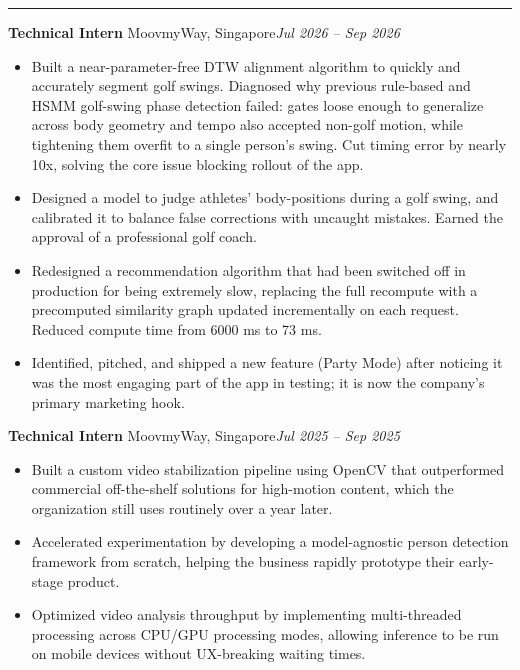 \documentclass[11pt]{article}
\newcommand{\cvsection}[1]{%
  \vspace{10pt}%
  \noindent{\large\bfseries\MakeUppercase{#1}}\par
  \vspace{-4pt}\noindent\rule{\linewidth}{0.7pt}\vspace{4pt}%
}
\begin{document}
\cvsection{Experience}
\noindent\textbf{Technical Intern} MoovmyWay, Singapore\hfill\textit{Jul 2026 -- Sep 2026}\par
\begin{itemize}
  \item Built a near-parameter-free DTW alignment algorithm to quickly and accurately segment golf swings. Diagnosed why previous rule-based and HSMM golf-swing phase detection failed: gates loose enough to generalize across body geometry and tempo also accepted non-golf motion, while tightening them overfit to a single person's swing. Cut timing error by nearly 10x, solving the core issue blocking rollout of the app.
  \item Designed a model to judge athletes' body-positions during a golf swing, and calibrated it to balance false corrections with uncaught mistakes. Earned the approval of a professional golf coach.
  \item Redesigned a recommendation algorithm that had been switched off in production for being extremely slow, replacing the full recompute with a precomputed similarity graph updated incrementally on each request. Reduced compute time from 6000 ms to 73 ms.
  \item Identified, pitched, and shipped a new feature (Party Mode) after noticing it was the most engaging part of the app in testing; it is now the company's primary marketing hook.
\end{itemize}

\vspace{4pt}
\noindent\textbf{Technical Intern} MoovmyWay, Singapore\hfill\textit{Jul 2025 -- Sep 2025}\par
\begin{itemize}
  \item Built a custom video stabilization pipeline using OpenCV that outperformed commercial off-the-shelf solutions for high-motion content, which the organization still uses routinely over a year later.
  \item Accelerated experimentation by developing a model-agnostic person detection framework from scratch, helping the business rapidly prototype their early-stage product.
  \item Optimized video analysis throughput by implementing multi-threaded processing across CPU/GPU processing modes, allowing inference to be run on mobile devices without UX-breaking waiting times.
\end{itemize}
\end{document}
